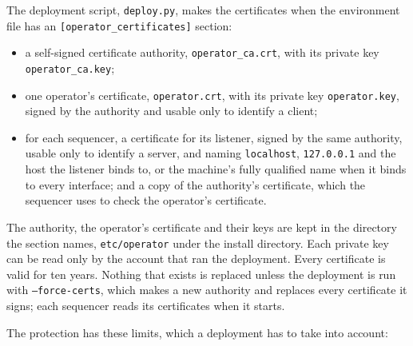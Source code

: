The deployment script, \texttt{deploy.py}, makes the certificates when the
environment file has an \texttt{[operator\_certificates]} section:

\begin{itemize}
  \item a self-signed certificate authority, \texttt{operator\_ca.crt}, with its
        private key \texttt{operator\_ca.key};
  \item one operator's certificate, \texttt{operator.crt}, with its private key
        \texttt{operator.key}, signed by the authority and usable only to
        identify a client;
  \item for each sequencer, a certificate for its listener, signed by the same
        authority, usable only to identify a server, and naming
        \texttt{localhost}, \texttt{127.0.0.1} and the host the listener binds
        to, or the machine's fully qualified name when it binds to every
        interface; and a copy of the authority's certificate, which the
        sequencer uses to check the operator's certificate.
\end{itemize}

The authority, the operator's certificate and their keys are kept in the
directory the section names, \texttt{etc/operator} under the install directory.
Each private key can be read only by the account that ran the deployment. Every
certificate is valid for ten years. Nothing that exists is replaced unless the
deployment is run with \texttt{--force-certs}, which makes a new authority and
replaces every certificate it signs; each sequencer reads its certificates when
it starts.

The protection has these limits, which a deployment has to take into account:

